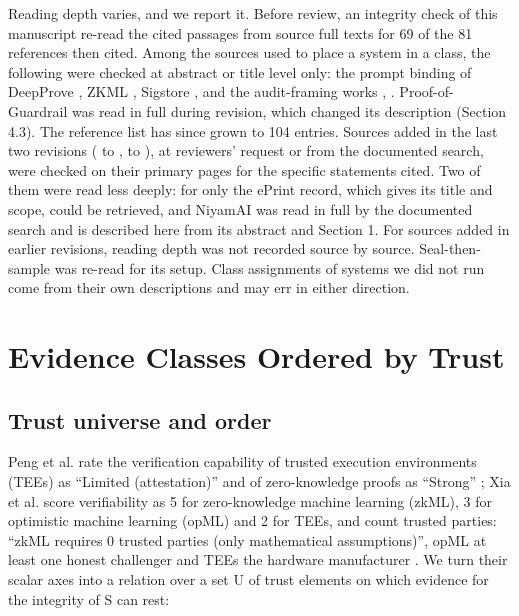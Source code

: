 \documentclass[11pt]{article}
\begin{document}
Reading depth varies, and we report it. Before review, an integrity check of this manuscript re-read the cited passages from source full texts for 69 of the 81 references then cited. Among the sources used to place a system in a class, the following were checked at abstract or title level only: the prompt binding of DeepProve \cite{A17}, ZKML \cite{A8}, Sigstore \cite{C20}, and the audit-framing works \cite{D16}, \cite{D18}. Proof-of-Guardrail \cite{B24} was read in full during revision, which changed its description (Section 4.3). The reference list has since grown to 104 entries. Sources added in the last two revisions (\cite{A39} to \cite{A47}, \cite{B25} to \cite{B29}), at reviewers' request or from the documented search, were checked on their primary pages for the specific statements cited. Two of them were read less deeply: for \cite{A43} only the ePrint record, which gives its title and scope, could be retrieved, and NiyamAI \cite{A44} was read in full by the documented search and is described here from its abstract and Section 1. For sources added in earlier revisions, reading depth was not recorded source by source. Seal-then-sample \cite{A22} was re-read for its setup. Class assignments of systems we did not run come from their own descriptions and may err in either direction.

\section{Evidence Classes Ordered by Trust}

\subsection{Trust universe and order}

Peng et al. rate the verification capability of trusted execution environments (TEEs) as ``Limited (attestation)'' and of zero-knowledge proofs as ``Strong'' \cite{A32}; Xia et al. score verifiability as 5 for zero-knowledge machine learning (zkML), 3 for optimistic machine learning (opML) and 2 for TEEs, and count trusted parties: ``zkML requires 0 trusted parties (only mathematical assumptions)'', opML at least one honest challenger and TEEs the hardware manufacturer \cite{A35}. We turn their scalar axes into a relation over a set U of trust elements on which evidence for the integrity of S can rest:
\end{document}
